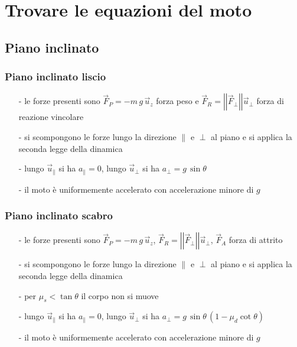 \documentclass[a4paper]{article}
\newcommand\uz{\vec{u}_z}
\newcommand\vmod[1]{\left|\left|{#1}\right|\right|}
\begin{document}
\newpage


\section{Trovare le equazioni del moto}
\subsection{Piano inclinato}
\subsubsection*{Piano inclinato liscio}
\begin{itemize}[topsep=3pt, itemsep=0pt]
	\item[-] le forze presenti sono \(\vec{F}_P = -m \, g \, \uz\) forza peso e \(\vec{F}_R = \vmod{\vec{F}_\perp} \vec{u}_\perp\) forza di reazione vincolare
	\item[-] si scompongono le forze lungo la direzione \(\parallel\) e \(\perp\) al piano e si applica la seconda legge della dinamica
	\item[-] lungo \(\vec{u}_\parallel\) si ha \(a_\parallel = 0\), lungo \(\vec{u}_\perp\) si ha \(a_\perp = g \, \sin \theta\)
	\item[-] il moto è uniformemente accelerato con accelerazione minore di \(g\)
\end{itemize}

\subsubsection*{Piano inclinato scabro}
\begin{itemize}[topsep=3pt, itemsep=0pt]
	\item[-] le forze presenti sono \(\vec{F}_P = -m \, g \, \uz\), \(\vec{F}_R = \vmod{\vec{F}_\perp} \vec{u}_\perp\), \(\vec{F}_A\) forza di attrito
	\item[-] si scompongono le forze lungo la direzione \(\parallel\) e \(\perp\) al piano e si applica la seconda legge della dinamica
	\item[-] per \(\mu_s < \tan \theta\) il corpo non si muove
	\item[-] lungo \(\vec{u}_\parallel\) si ha \(a_\parallel = 0\), lungo \(\vec{u}_\perp\) si ha \(a_\perp = g \, \sin \theta \, (1-\mu_d \cot \theta)\)
	\item[-] il moto è uniformemente accelerato con accelerazione minore di \(g\)
\end{itemize}
\end{document}
